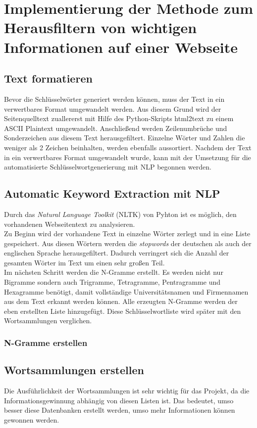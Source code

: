 \section{Implementierung der Methode zum Herausfiltern von wichtigen Informationen auf einer Webseite}
	\subsection{Text formatieren}
	\label{subsec:TextFormatieren}
	Bevor die Schlüsselwörter generiert werden können, muss der Text in ein verwertbares Format umgewandelt werden. Aus diesem Grund wird der Seitenquelltext zuallererst mit Hilfe des Python-Skripts html2text zu einem ASCII Plaintext umgewandelt.\cite{html2text} Anschließend werden Zeilenumbrüche und Sonderzeichen aus diesem Text herausgefiltert. Einzelne Wörter und Zahlen die weniger als 2 Zeichen beinhalten, werden ebenfalls aussortiert. Nachdem der Text in ein verwertbares Format umgewandelt wurde, kann mit der Umsetzung für die automatisierte Schlüsselwortgenerierung mit NLP begonnen werden.
	\subsection{Automatic Keyword Extraction mit NLP}
	\label{subsec:AutomaticKeywordExtractionNLP}
	Durch das \textit{Natural Language Toolkit} (NLTK) von Pyhton ist es möglich, den vorhandenen Webseitentext zu analysieren.\\
	Zu Beginn wird der vorhandene Text in einzelne Wörter zerlegt und in eine Liste gespeichert. Aus diesen Wörtern werden die \textit{stopwords} der deutschen als auch der englischen Sprache herausgefiltert. Dadurch verringert sich die Anzahl der gesamten Wörter im Text um einen sehr großen Teil. \\
	Im nächsten Schritt werden die N-Gramme erstellt. Es werden nicht nur Bigramme sondern auch Trigramme, Tetragramme, Pentragramme und Hexagramme benötigt, damit vollständige Universitätsnamen und Firmennamen aus dem Text erkannt werden können. Alle erzeugten N-Gramme werden der eben erstellten Liste hinzugefügt. Diese Schlüsselwortliste wird später mit den Wortsammlungen verglichen.
		\subsubsection{N-Gramme erstellen}
		
	\subsection{Wortsammlungen erstellen}
	Die Ausführlichkeit der Wortsammlungen ist sehr wichtig für das Projekt, da die Informationsgewinnung abhängig von diesen Listen ist. Das bedeutet, umso besser diese Datenbanken erstellt werden, umso mehr Informationen können gewonnen werden.
	
